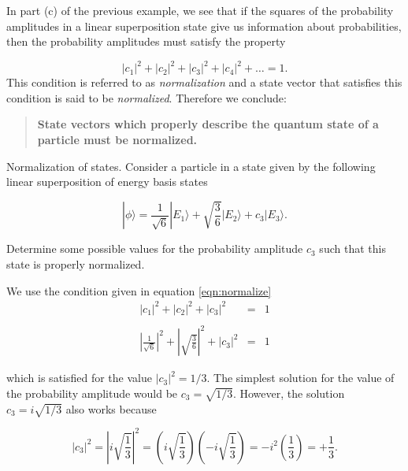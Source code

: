 In part (c) of the previous example, we see that if the squares of
the probability amplitudes in a linear superposition state give us
information about probabilities, then the probability amplitudes must
satisfy the property

\begin{equation}
|c_1|^2 + |c_2|^2 + |c_3|^2 + |c_4|^2 + \ldots = 1 .
\label{eqn:normalize}
\end{equation}
This condition is referred to as {\em normalization} and a state vector that satisfies this condition is said to be {\em normalized}.  Therefore we conclude:
\\
\begin{quote}
{\bf State vectors which properly describe the quantum state of a particle must be normalized.}
\end{quote}

\begin{example}{Normalization of states.}
\label{exam:Normalized}
Consider a particle in a state given by the following linear superposition of energy basis states

\begin{equation}
|\mbox{$\phi$}\rangle = \frac{1}{\sqrt{6}} |\mbox{$E_1$}\rangle + \sqrt{\frac{3}{6}} |\mbox{$E_2$}\rangle + c_3 |\mbox{$E_3$}\rangle  .
\end{equation}

Determine some possible values for the probability amplitude $c_3$
such that this state is properly normalized.

\solution We use the condition given in equation \ref{eqn:normalize}
\begin{eqnarray}
|c_1|^2 + |c_2|^2 + |c_3|^2 & = & 1 \nonumber\\
\nonumber \\
\left|\frac{1}{\sqrt{6}}\right|^2 + \left|\sqrt{\frac{3}{6}}\right|^2 + |c_3|^2 & = & 1 \nonumber 
\end{eqnarray}

\noindent which is satisfied for the value $|c_3|^2 = 1/3$.  The simplest
solution for the value of the probability amplitude would be $c_3 =
\sqrt{1/3}$.  However, the solution $c_3 = i \sqrt{1/3}$ also works
because

\begin{equation}
|c_3|^2 = \left| i \sqrt{\frac{1}{3}}\right|^2 = \left( i \sqrt{\frac{1}{3}} \right) \left( -i \sqrt{\frac{1}{3}} \right) = - i^2 \left(\frac{1}{3} \right) = + \frac{1}{3}  .\nonumber
\end{equation}

\end{example}

